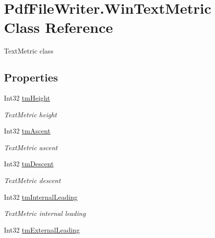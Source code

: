 \hypertarget{class_pdf_file_writer_1_1_win_text_metric}{}\section{Pdf\+File\+Writer.\+Win\+Text\+Metric Class Reference}
\label{class_pdf_file_writer_1_1_win_text_metric}


Text\+Metric class  


\subsection*{Properties}
\begin{DoxyCompactItemize}
\item 
Int32 \hyperlink{class_pdf_file_writer_1_1_win_text_metric_a1c1e7fff0af44e242b4e9c3659ef2969}{tm\+Height}
\begin{DoxyCompactList}\small\item\em Text\+Metric height \end{DoxyCompactList}\item 
Int32 \hyperlink{class_pdf_file_writer_1_1_win_text_metric_a1a2b73c4ecb48b4aff0942fc11a3ee12}{tm\+Ascent}
\begin{DoxyCompactList}\small\item\em Text\+Metric ascent \end{DoxyCompactList}\item 
Int32 \hyperlink{class_pdf_file_writer_1_1_win_text_metric_a51fedd077b2f079bfdc1272b63f97b13}{tm\+Descent}
\begin{DoxyCompactList}\small\item\em Text\+Metric descent \end{DoxyCompactList}\item 
Int32 \hyperlink{class_pdf_file_writer_1_1_win_text_metric_a9685d19b3af05524b3a9505346e10986}{tm\+Internal\+Leading}
\begin{DoxyCompactList}\small\item\em Text\+Metric internal leading \end{DoxyCompactList}\item 
Int32 \hyperlink{class_pdf_file_writer_1_1_win_text_metric_a3d04723b2afe704c3ec97d6a13938199}{tm\+External\+Leading}

\end{DoxyCompactItemize}
